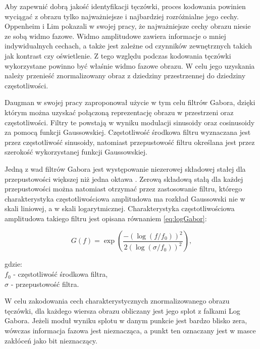 Aby zapewni\'c dobrą jakoś\'c identyfikacji tęczówki, proces kodowania powinien wyciąga\'c
z obrazu tylko najważniejsze i najbardziej rozróżnialne jego cechy.
Oppenheim i Lim \cite{OppenheimLim} pokazali w swojej pracy, że najważniejsze
cechy obrazu niesie ze sobą widmo fazowe. Widmo amplitudowe zawiera
informacje o mniej indywidualnych cechach, a także jest zależne od czynników zewnętrznych takich
jak kontrast czy oświetlenie. Z tego względu podczas kodowania tęczówki wykorzystane
powinno by\'c właśnie widmo fazowe obrazu. W celu jego uzyskania należy przenieś\'c znormalizowany
obraz z dziedziny przestrzennej do dziedziny częstotliwości.\newline

Daugman \cite{DaugmanHowIrisRecognitionWorks} w swojej pracy zaproponował użycie w tym celu
filtrów Gabora, dzięki którym można uzyska\'c połączoną reprezentację obrazu w przestrzeni
oraz częstotliwości. Filtry te powstają w wyniku modulacji sinusoidy oraz cosinusoidy za pomocą
funkcji Gaussowskiej.
Częstotliwoś\'c środkowa filtru wyznaczana jest przez częstotliwoś\'c sinusoidy, natomiast
przepustowoś\'c filtru określana jest przez szerokoś\'c wykorzystanej funkcji Gaussowskiej.

Jedną z wad filtrów Gabora jest występowanie niezerowej składowej stałej dla przepustowości
większej niż jedna oktawa \cite{FieldGaborOctave}. Zerową składową stałą dla każdej przepustowości
można natomiast otrzyma\'c przez zastosowanie filtru, którego charakterystyka częstotliwościowa
amplitudowa ma rozkład Gaussowski nie w skali liniowej, a w skali logarytmicznej. Charakterystyka
częstotliwościowa amplitudowa takiego filtru jest opisana równaniem \ref{eq:logGabor}:

\begin{equation}
  \mathit{G(f)} = \exp\left(
  \frac{
    -\left( \log\left( f / f_{0}\right)\right)^{2}
  }{
    2\left(\log\left( \sigma / f_{0}\right)\right)^{2}
  }
  \right),
  \label{eq:logGabor}
\end{equation}

\noindent
gdzie:\\
\indent $f_{0}$ - częstotliwoś\'c środkowa filtra,\\
\indent $\sigma$ - przepustowoś\'c filtra.\newline

W celu zakodowania cech charakterystycznych znormalizowanego obrazu tęczówki, dla każdego wiersza
obrazu obliczany jest jego splot z falkami Log Gabora. Jeżeli moduł wyniku splotu w danym punkcie
jest bardzo blisko zera, wówczas informacja fazowa jest nieznacząca, a punkt ten oznaczany jest w
masce zakłóceń jako bit nieznaczący.

